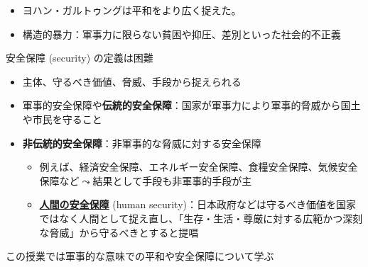 \documentclass[
  xelatex,
  ja=standard]{bxjsarticle}
\providecommand{\tightlist}{%
  \setlength{\itemsep}{0pt}\setlength{\parskip}{0pt}}\usepackage{longtable,booktabs,array}
\begin{document}
\begin{itemize}
\tightlist
\item
  ヨハン・ガルトゥングは平和をより広く捉えた。
\item
  構造的暴力：軍事力に限らない貧困や抑圧、差別といった社会的不正義
\end{itemize}

安全保障 (security) の定義は困難

\begin{itemize}
\tightlist
\item
  主体、守るべき価値、脅威、手段から捉えられる\citep[第1章]{boudai2018}
\item
  軍事的安全保障や\textbf{伝統的安全保障}：国家が軍事力により軍事的脅威から国土や市民を守ること
\item
  \textbf{非伝統的安全保障}：非軍事的な脅威に対する安全保障

  \begin{itemize}
  \tightlist
  \item
    例えば、経済安全保障、エネルギー安全保障、食糧安全保障、気候安全保障など\(\leadsto\)結果として手段も非軍事的手段が主
  \item
    \href{https://www.mofa.go.jp/mofaj/gaiko/oda/bunya/security/index.html}{\textbf{人間の安全保障}}
    (human
    security)：日本政府などは守るべき価値を国家ではなく人間として捉え直し、「生存・生活・尊厳に対する広範かつ深刻な脅威」から守るべきとすると提唱\citep{hs2003, sen2006, osa2021}
  \end{itemize}
\end{itemize}

この授業では軍事的な意味での平和や安全保障について学ぶ


  
\end{document}
